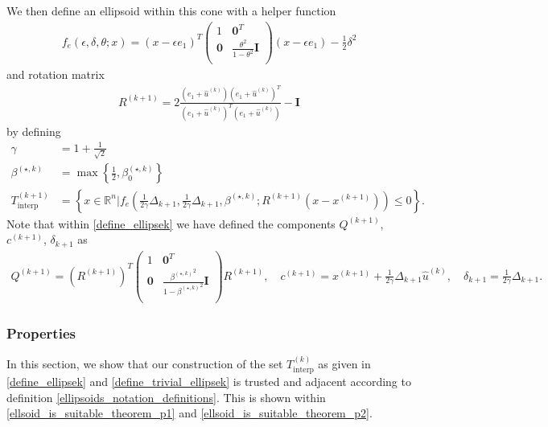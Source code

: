 \documentclass{article}
\theoremstyle{case}
\numberwithin{theorem}{subsection}
\newcommand{\bs}{{\beta^{(\star, k)}}}
\newcommand{\bsk}{{\beta_0^{(\star, k)}}}
\newcommand{\dkpo}{\Delta_{k+1}}
\newcommand{\huk}{{{\hat u}^{(k)}}}
\newcommand{\Rn}{\mathbb R^n}
\newcommand{\rotk}{{R^{(k+1)}}}
\newcommand{\sampletrk}{{T_{\text{interp}}^{(k)}}}
\newcommand{\sampletrkpo}{{T_{\text{interp}}^{(k+1)}}}
\newcommand{\xkpo}{{{x}^{(k+1)}}}
\newcommand{\qkpo}{{Q^{(k+1)}}}
\newcommand{\ckpo}{{c^{(k+1)}}}
\newcommand{\sdkpo}{{\delta_{k+1}}}
\begin{document}
We then define an ellipsoid within this cone with a helper function
\begin{align}
f_e(\epsilon, \delta, \theta; x) = (x - \epsilon e_1)^T\begin{pmatrix}
1 & \boldsymbol0^T \\
\boldsymbol 0 & \frac{\theta^2}{1 - \theta^2} \boldsymbol I \\
\end{pmatrix}(x - \epsilon e_1) - \frac 1 2 \delta^2 \label{define_ellipse_function}
\end{align}
and rotation matrix
\begin{align}
\rotk = 2\frac{(e_1 + \huk)(e_1 + \huk)^T}{(e_1 + \huk)^T(e_1 + \huk)} - \boldsymbol I \label{define_rotation}
\end{align}
by defining
\begin{align}
\gamma &= 1 + \frac 1 {\sqrt{2}} \label{define_the_constant_gamma} \\
\bs &= \max\left\{\frac 1 2 , \bsk\right\} \label{define_bs} \\
\sampletrkpo &= \left\{x \in \Rn | f_e\left(\frac 1 {2\gamma} \dkpo, \frac 1 {2\gamma} \dkpo,\bs; \rotk(x - \xkpo)\right) \le 0\right\}. \label{define_ellipsek}
\end{align}
Note that within \cref{define_ellipsek} we have defined the components $\qkpo$, $\ckpo$, $\sdkpo$ as
\begin{align}
\qkpo = \left(\rotk\right)^T \begin{pmatrix}
1 & \boldsymbol0^T \\
\boldsymbol 0 & \frac{\bs^2}{1 - \bs^2} \boldsymbol I \\
\end{pmatrix} \rotk, \quad
\ckpo = \xkpo + \frac 1 {2\gamma} \dkpo \huk, \quad
\sdkpo = \frac 1 {2\gamma} \dkpo. \label{conservative_ellipsoid_details}
\end{align}


\subsubsection{Properties}
\label{feasible_ellipsoid_analysis}

In this section, we show that our construction of the set $\sampletrk$ as given in 
\cref{define_ellipsek} and \cref{define_trivial_ellipsek}
is trusted and adjacent according to definition \cref{ellipsoids_notation_definitions}.
This is shown within \cref{ellsoid_is_suitable_theorem_p1} and \cref{ellsoid_is_suitable_theorem_p2}.
\end{document}
